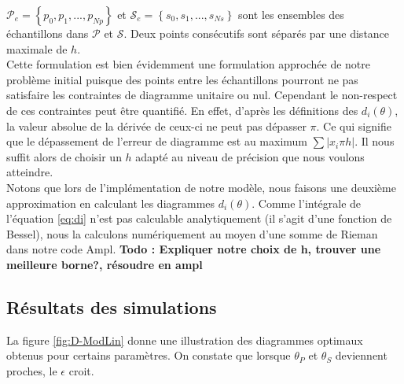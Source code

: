 $\mathcal{P}_e = \left\lbrace p_0,p_1,...,p_{Np}\right\rbrace$ et $\mathcal{S}_e= \left\lbrace s_0,s_1,...,s_{Ns}\right\rbrace$ sont les ensembles des échantillons dans $\mathcal{P}$ et $\mathcal{S}$. Deux points consécutifs sont séparés par une distance maximale de $h$.\\
Cette formulation est bien évidemment une formulation approchée de notre problème initial puisque des points entre les échantillons pourront ne pas satisfaire les contraintes de diagramme unitaire ou nul. Cependant le non-respect de ces contraintes peut être quantifié. En effet, d'après les définitions des $d_i(\theta)$, la valeur absolue de la dérivée de ceux-ci ne peut pas dépasser $\pi$. Ce qui signifie que le dépassement de l'erreur de diagramme est au maximum $\sum |x_i\pi h|$. Il nous suffit alors de choisir un $h$ adapté au niveau de précision que nous voulons atteindre. 
\\
Notons que lors de l'implémentation de notre modèle, nous faisons une deuxième approximation en calculant les diagrammes $d_i(\theta)$. Comme l'intégrale de l'équation \eqref{eq:di} n'est pas calculable analytiquement (il s'agit d'une fonction de Bessel), nous la calculons numériquement au moyen d'une somme de Rieman dans notre code Ampl.
\textbf{Todo : Expliquer notre choix de h, trouver une meilleure borne?, résoudre en ampl}		\\

\subsection{Résultats des simulations}
La figure \ref{fig:D-ModLin} donne une illustration des diagrammes optimaux obtenus pour certains paramètres. On constate que lorsque $\theta_P$ et $\theta_S$ deviennent proches, le $\epsilon$ croit.

